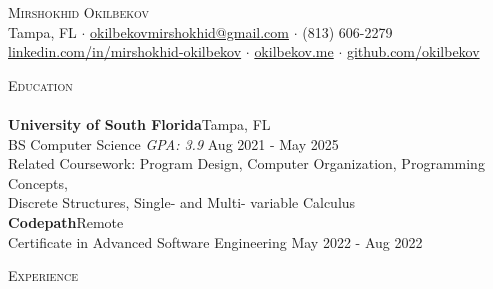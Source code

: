 \documentclass[a4paper]{article}
\newcommand{\lineunder} {
    \vspace*{-8pt} \\
    \hspace*{-18pt} \hrulefill \\
}
\newcommand{\header} [1] {
    {\hspace*{-18pt}\vspace*{6pt} \textsc{#1}}
    \vspace*{-6pt} \lineunder
}
\begin{document}
\vspace*{-40pt}

    

\vspace*{-10pt}
\begin{center}
	{\Huge \scshape {Mirshokhid Okilbekov}}\\
	Tampa, FL $\cdot$ \href{mailto:okilbekovmirshokhid@gmail.com}{okilbekovmirshokhid@gmail.com} $\cdot$ (813) 606-2279 \\ \href{https://linkedin.com/in/mirshokhid-okilbekov}{linkedin.com/in/mirshokhid-okilbekov} $\cdot$ \href{https://okilbekov.me}{okilbekov.me} $\cdot$ \href{https://github.com/okilbekov}{github.com/okilbekov} \\
\end{center}

{\Large \header{Education}}
\textbf{University of South Florida}\hfill Tampa, FL\\
BS Computer Science \textit{GPA: 3.9} \hfill Aug 2021 - May 2025\\
Related Coursework: Program Design, Computer Organization, Programming Concepts, \\Discrete Structures, Single- and Multi- variable Calculus \\
\vspace{2mm}
\textbf{Codepath}\hfill Remote\\
Certificate in Advanced Software Engineering \hfill May 2022 - Aug 2022\\
\vspace{1mm}

{\Large \header{Experience}}
\end{document}
